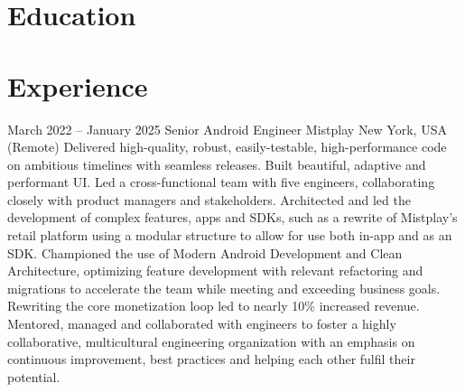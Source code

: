 \documentclass[10pt,a4paper,sans]{moderncv} %
\newcommand{\vs}[0]{\smallskip}
\begin{document}
\makecvtitle %
\vspace{-1cm}


\section{Education}

\vs
{}



\section{Experience}


\cventry
{March 2022 -- January 2025}
{Senior Android Engineer}
{{Mistplay}}
{New York, USA (Remote)}
{}{
	Delivered high-quality, robust, easily-testable, high-performance code on ambitious timelines with seamless releases. Built beautiful, adaptive and performant UI.
	Led a cross-functional team with five engineers, collaborating closely with product managers and stakeholders.
	Architected and led the development of complex features, apps and SDKs, such as a rewrite of Mistplay’s retail platform using a modular structure to allow for use both in-app and as an SDK.
	Championed the use of Modern Android Development and Clean Architecture, optimizing feature development with relevant refactoring and migrations to accelerate the team while meeting and exceeding business goals. Rewriting the core monetization loop led to nearly 10\% increased revenue.
	Mentored, managed and collaborated with engineers to foster a highly collaborative, multicultural engineering organization with an emphasis on continuous improvement, best practices and helping each other fulfil their potential.
}\vs
\end{document}

